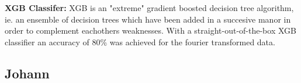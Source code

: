 \documentclass{article}
\begin{document}
\textbf{XGB Classifer:}
XGB is an "extreme" gradient boosted decision tree algorithm, ie. an ensemble of decision trees which have been added in a succesive manor in order to complement eachothers weaknesses.
With a straight-out-of-the-box XGB classifier an accuracy of 80\% was achieved for the fourier transformed data.


\subsection{Johann}
\end{document}
